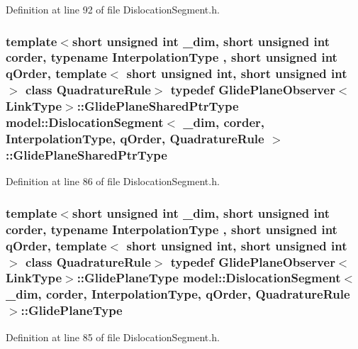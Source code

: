 Definition at line 92 of file Dislocation\+Segment.\+h.

\hypertarget{classmodel_1_1_dislocation_segment_a0563390515c7e0e65c8f949e545b1fc6}{}
\subsubsection[{Glide\+Plane\+Shared\+Ptr\+Type}]{\setlength{\rightskip}{0pt plus 5cm}template$<$short unsigned int \+\_\+dim, short unsigned int corder, typename Interpolation\+Type , short unsigned int q\+Order, template$<$ short unsigned int, short unsigned int $>$ class Quadrature\+Rule$>$ typedef {\bf Glide\+Plane\+Observer}$<${\bf Link\+Type}$>$\+::{\bf Glide\+Plane\+Shared\+Ptr\+Type} {\bf model\+::\+Dislocation\+Segment}$<$ \+\_\+dim, corder, Interpolation\+Type, q\+Order, Quadrature\+Rule $>$\+::{\bf Glide\+Plane\+Shared\+Ptr\+Type}}\label{classmodel_1_1_dislocation_segment_a0563390515c7e0e65c8f949e545b1fc6}


Definition at line 86 of file Dislocation\+Segment.\+h.

\hypertarget{classmodel_1_1_dislocation_segment_a1e6ed83f6325baa55fed3ad066e0f8d1}{}
\subsubsection[{Glide\+Plane\+Type}]{\setlength{\rightskip}{0pt plus 5cm}template$<$short unsigned int \+\_\+dim, short unsigned int corder, typename Interpolation\+Type , short unsigned int q\+Order, template$<$ short unsigned int, short unsigned int $>$ class Quadrature\+Rule$>$ typedef {\bf Glide\+Plane\+Observer}$<${\bf Link\+Type}$>$\+::{\bf Glide\+Plane\+Type} {\bf model\+::\+Dislocation\+Segment}$<$ \+\_\+dim, corder, Interpolation\+Type, q\+Order, Quadrature\+Rule $>$\+::{\bf Glide\+Plane\+Type}}\label{classmodel_1_1_dislocation_segment_a1e6ed83f6325baa55fed3ad066e0f8d1}


Definition at line 85 of file Dislocation\+Segment.\+h.

\hypertarget{classmodel_1_1_dislocation_segment_a038d9448e2a98c8da218d1dae63576e1}{}
